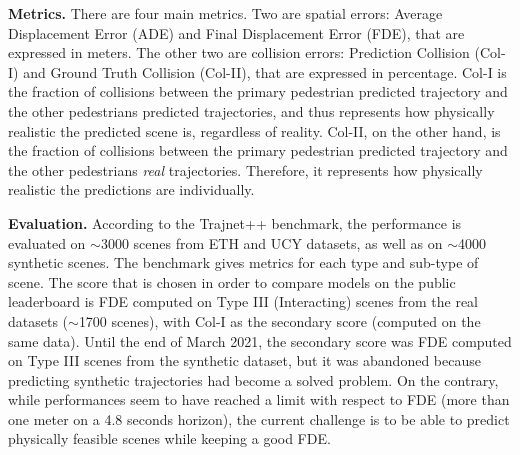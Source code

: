 \documentclass[conference]{IEEEtran}
\newcommand{\block}{\textbf}
\begin{document}
\block{Metrics.} There are four main metrics. Two are spatial errors: Average Displacement Error (ADE) and Final Displacement Error (FDE), that are expressed in meters. The other two are collision errors: Prediction Collision (Col-I) and Ground Truth Collision (Col-II), that are expressed in percentage. Col-I is the fraction of collisions between the primary pedestrian predicted trajectory and the other pedestrians predicted trajectories, and thus represents how physically realistic the predicted scene is, regardless of reality. Col-II, on the other hand, is the fraction of collisions between the primary pedestrian predicted trajectory and the other pedestrians \textit{real} trajectories. Therefore, it represents how physically realistic the predictions are individually.

\block{Evaluation.} According to the Trajnet++ benchmark, the performance is evaluated on $\sim$3000 scenes from ETH and UCY datasets, as well as on $\sim$4000 synthetic scenes. The benchmark gives metrics for each type and sub-type of scene. The score that is chosen in order to compare models on the public leaderboard is FDE computed on Type III (Interacting) scenes from the real datasets ($\sim$1700 scenes), with Col-I as the secondary score (computed on the same data). Until the end of March 2021, the secondary score was FDE computed on Type III scenes from the synthetic dataset, but it was abandoned because predicting synthetic trajectories had become a solved problem. On the contrary, while performances seem to have reached a limit with respect to FDE (more than one meter on a 4.8 seconds horizon), the current challenge is to be able to predict physically feasible scenes while keeping a good FDE.
\end{document}

